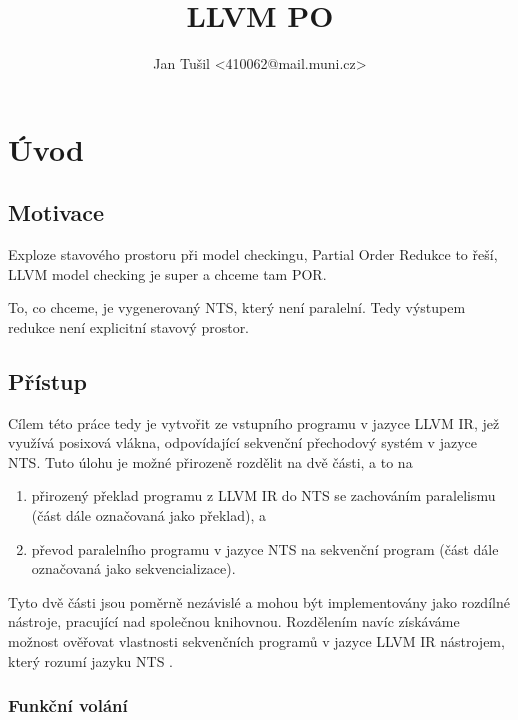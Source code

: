 \documentclass[10pt,a4paper,notitlepage]{report}
\author{Jan Tušil <410062@mail.muni.cz>}
\title{LLVM PO}
\begin{document}
\chapter{Úvod}
\section{Motivace}
Exploze stavového prostoru při model checkingu, Partial Order Redukce to řeší,
LLVM model checking je super a chceme tam POR.

To, co chceme, je vygenerovaný NTS, který není paralelní. Tedy výstupem redukce
není explicitní stavový prostor.

\section{Přístup}
Cílem této práce tedy je vytvořit ze vstupního programu v jazyce LLVM IR, jež využívá posixová vlákna, odpovídající sekvenční přechodový systém v jazyce NTS. Tuto úlohu je možné přirozeně rozdělit na dvě části, a to na
\begin{enumerate}
\item přirozený překlad programu z LLVM IR do NTS se zachováním paralelismu (část dále označovaná jako překlad), a
\item převod paralelního programu v jazyce NTS na sekvenční program (část dále označovaná jako sekvencializace).
\end{enumerate}

Tyto dvě části jsou poměrně nezávislé a mohou být implementovány jako rozdílné nástroje, pracující nad společnou knihovnou. Rozdělením navíc získáváme možnost ověřovat vlastnosti sekvenčních programů v jazyce LLVM IR nástrojem, který rozumí jazyku NTS .




\subsection{Funkční volání} %
\end{document}

